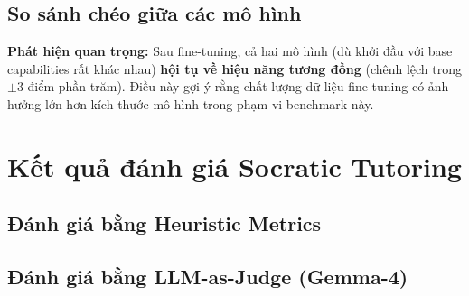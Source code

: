 \subsection{So sánh chéo giữa các mô hình}

\textbf{Phát hiện quan trọng:} Sau fine-tuning, cả hai mô hình (dù khởi đầu với base capabilities rất khác nhau) \textbf{hội tụ về hiệu năng tương đồng} (chênh lệch trong $\pm$3 điểm phần trăm). Điều này gợi ý rằng chất lượng dữ liệu fine-tuning có ảnh hưởng lớn hơn kích thước mô hình trong phạm vi benchmark này.

\section{Kết quả đánh giá Socratic Tutoring}

\subsection{Đánh giá bằng Heuristic Metrics}

\begin{table}[h]
\centering
\renewcommand{\arraystretch}{1.3}
\caption{Kết quả đánh giá Socratic Tutor (Qwen2.5-3B + LoRA)}
\label{tab:socratic_results}
\end{table}

\subsection{Đánh giá bằng LLM-as-Judge (Gemma-4)}

\begin{table}[h]
\centering
\renewcommand{\arraystretch}{1.3}
\caption{Điểm đánh giá từ Gemma-4 Judge (thang 5)}
\label{tab:llm_judge}
\end{table}

